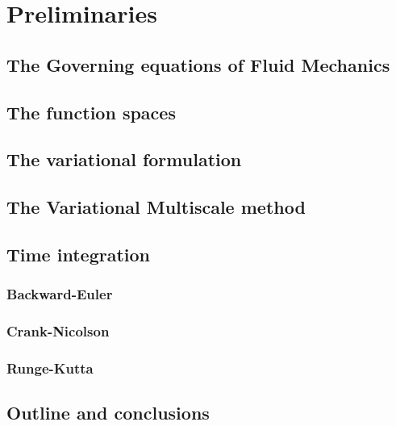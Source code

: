
\chapter{Preliminaries}
\label{chap-Preliminaries}


\newcommand{\keyword}[1]{\textbf{#1}}
\newcommand{\tabhead}[1]{\textbf{#1}}
\newcommand{\code}[1]{\texttt{#1}}
\newcommand{\file}[1]{\texttt{\bfseries#1}}
\newcommand{\option}[1]{\texttt{\itshape#1}}


\section{The Governing equations of Fluid Mechanics}


\section{The function spaces}


\section{The variational formulation}


\section{The Variational Multiscale method}
\label{sec-vms}


\section{Time integration}
\subsection{Backward-Euler}
\subsection{Crank-Nicolson}
\subsection{Runge-Kutta}


\section{Outline and conclusions}
